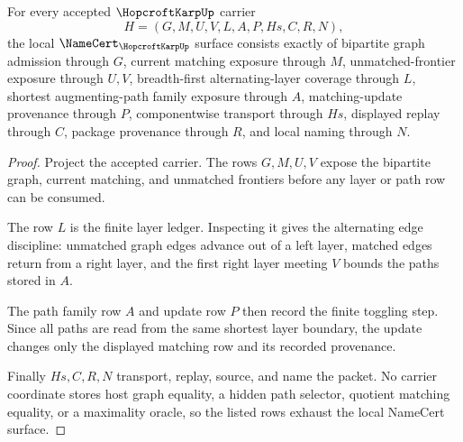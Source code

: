 \begin{theorem}
\label{thm:hopcroft-karp-namecert-obligations}
For every accepted $\HopcroftKarpUp$ carrier
$$
H=(G,M,U,V,L,A,P,Hs,C,R,N),
$$
the local $\NameCert_{\HopcroftKarpUp}$ surface consists exactly of bipartite graph admission through $G$, current matching exposure through $M$, unmatched-frontier exposure through $U,V$, breadth-first alternating-layer coverage through $L$, shortest augmenting-path family exposure through $A$, matching-update provenance through $P$, componentwise transport through $Hs$, displayed replay through $C$, package provenance through $R$, and local naming through $N$.
\end{theorem}
\begin{proof}
Project the accepted carrier. The rows $G,M,U,V$ expose the bipartite graph, current matching, and unmatched frontiers before any layer or path row can be consumed.

The row $L$ is the finite layer ledger. Inspecting it gives the alternating edge discipline: unmatched graph edges advance out of a left layer, matched edges return from a right layer, and the first right layer meeting $V$ bounds the paths stored in $A$.

The path family row $A$ and update row $P$ then record the finite toggling step. Since all paths are read from the same shortest layer boundary, the update changes only the displayed matching row and its recorded provenance.

Finally $Hs,C,R,N$ transport, replay, source, and name the packet. No carrier coordinate stores host graph equality, a hidden path selector, quotient matching equality, or a maximality oracle, so the listed rows exhaust the local NameCert surface.
\end{proof}

